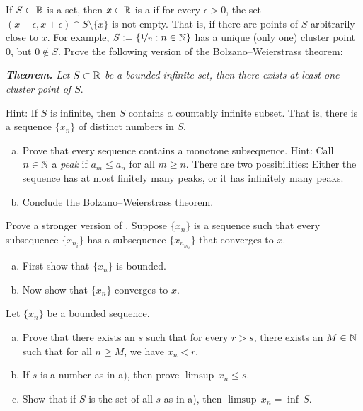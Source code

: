 \begin{exercise}
If $S \subset {\mathbb{R}}$ is a set, then $x \in {\mathbb{R}}$ is a \emph{}
if for every $\epsilon > 0$, the set $(x-\epsilon,x+\epsilon) \cap S
\setminus \{ x \}$ is not empty.  That is, if there are points of $S$
arbitrarily close to $x$.
For example, $S := \{ \nicefrac{1}{n} : n \in {\mathbb{N}} \}$ has a unique (only
one) cluster point $0$, but $0 \notin S$.
Prove the following version of the Bolzano--Weierstrass theorem:

\medskip

\noindent
\emph{\textbf{Theorem.} Let $S \subset {\mathbb{R}}$ be a bounded infinite set,
then there exists at least one cluster point of $S$}.

\medskip

Hint: If $S$ is infinite, then $S$ contains a countably infinite subset.
That is, there is a sequence $\{ x_n \}$ of distinct numbers in $S$.
\end{exercise}

\begin{samepage}
\begin{exercise}[Challenging]
\leavevmode
\begin{enumerate}[a)]
\item
Prove that every sequence contains a monotone subsequence.
Hint: Call $n \in {\mathbb{N}}$ a \emph{peak} if $a_m \leq a_n$ for all $m \geq n$.  
There are two possibilities: Either the sequence has at most finitely many
peaks,
or it has infinitely many peaks.
\item
Conclude the Bolzano--Weierstrass theorem.
\end{enumerate}
\end{exercise}
\end{samepage}

\begin{exercise}
Prove a stronger version of .
Suppose $\{ x_n \}$ is a sequence such that every subsequence $\{
x_{n_i} \}$ has a subsequence
$\{ x_{n_{m_i}} \}$ that converges to $x$.
\begin{enumerate}[a)]
\item
First show that $\{ x_n \}$ is
bounded.
\item
Now show that $\{ x_n \}$ converges to $x$.
\end{enumerate}
\end{exercise}

\begin{exercise}
Let $\{x_n\}$ be a bounded sequence.
\begin{enumerate}[a)]
\item
Prove that there exists an $s$ such that for every $r > s$, there exists 
an $M \in {\mathbb{N}}$ such that for all $n \geq M$, we have
$x_n < r$.
\item
If $s$ is a number as in a), then prove $\limsup \, x_n \leq s$.
\item
Show that if $S$ is the set of all $s$ as in a), then
$\limsup \, x_n = \inf \, S$.
\end{enumerate}
\end{exercise}


